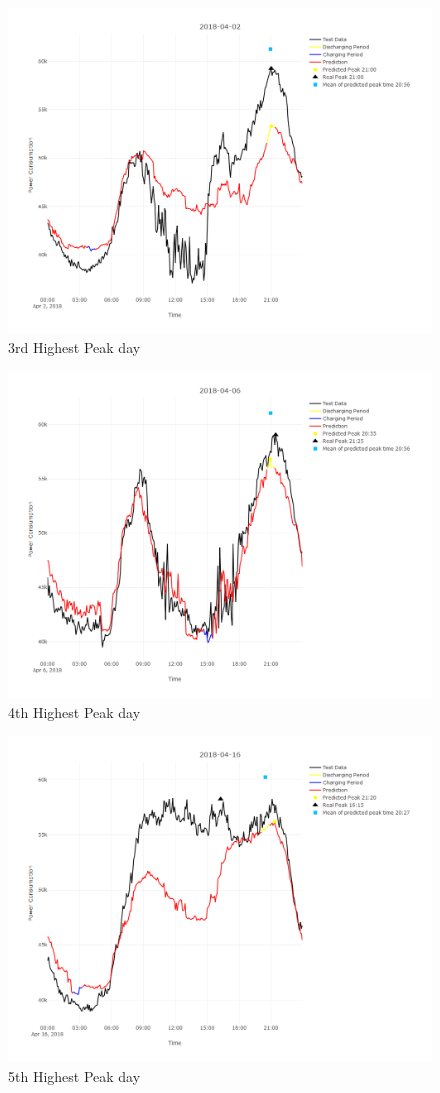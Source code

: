 \documentclass[
]{article}
\begin{document}
\begin{figure}
\includegraphics[width=1\linewidth]{day3} \caption{3rd Highest Peak day\label{day3}}\label{fig:day3}
\end{figure}

\begin{figure}
\includegraphics[width=1\linewidth]{day4} \caption{4th Highest Peak day\label{day4}}\label{fig:day4}
\end{figure}

\begin{figure}
\includegraphics[width=1\linewidth]{day5} \caption{5th Highest Peak day\label{day5}}\label{fig:day5}
\end{figure}
\end{document}
